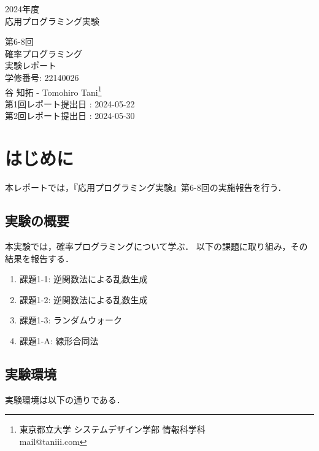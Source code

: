 \documentclass[fleqn, a4paper. 12pt]{jsarticle}
\begin{document}
  \begin{titlepage}
    \begin{center}
      {\Huge 2024年度\\応用プログラミング実験}
      
      \vspace{4cm}
      {\Huge 第6-8回\\確率プログラミング\\
        実験レポート\\
      }
      \vspace{4cm}
      {\large 学修番号: 22140026\\谷 知拓 - Tomohiro Tani\footnote{東京都立大学 システムデザイン学部 情報科学科 \\ mail@taniii.com} \\}
      \vspace{0.5cm}
      {\large
        第1回レポート提出日 : 2024-05-22 \\
        第2回レポート提出日 : 2024-05-30
      }
    \end{center}
  \end{titlepage}

  \section*{はじめに}

    本レポートでは，『応用プログラミング実験』第6-8回の実施報告を行う．

  \subsection*{実験の概要}

    本実験では，確率プログラミングについて学ぶ．
    以下の課題に取り組み，その結果を報告する．

    \begin{enumerate}
      \item 課題1-1: 逆関数法による乱数生成
      \item 課題1-2: 逆関数法による乱数生成
      \item 課題1-3: ランダムウォーク
      \item 課題1-A: 線形合同法
    \end{enumerate}

  \subsection*{実験環境}

    実験環境は以下の通りである．
\end{document}
